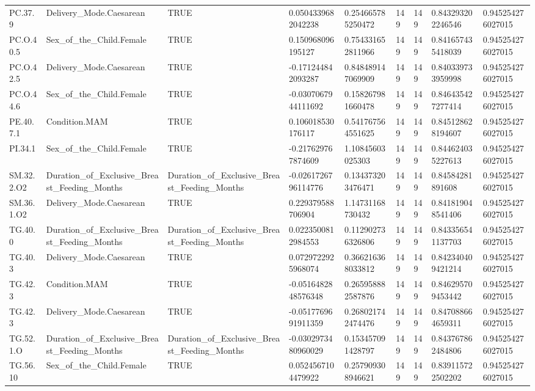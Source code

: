 \begin{longtable}{lllllllll}
PC.37.9 & Delivery\_Mode.Caesarean & TRUE & 0.0504339682042238 & 0.254665785250472 & 149 & 149 & 0.843293202246546 & 0.945254276027015 \\
PC.O.40.5 & Sex\_of\_the\_Child.Female & TRUE & 0.150968096195127 & 0.754331652811966 & 149 & 149 & 0.841657435418039 & 0.945254276027015 \\
PC.O.42.5 & Delivery\_Mode.Caesarean & TRUE & -0.171244842093287 & 0.848489147069909 & 149 & 149 & 0.840339733959998 & 0.945254276027015 \\
PC.O.44.6 & Sex\_of\_the\_Child.Female & TRUE & -0.0307067944111692 & 0.158267981660478 & 149 & 149 & 0.846435427277414 & 0.945254276027015 \\
PE.40.7.1 & Condition.MAM & TRUE & 0.106018530176117 & 0.541767564551625 & 149 & 149 & 0.845128628194607 & 0.945254276027015 \\
PI.34.1 & Sex\_of\_the\_Child.Female & TRUE & -0.217629767874609 & 1.10845603025303 & 149 & 149 & 0.844624035227613 & 0.945254276027015 \\
SM.32.2.O2 & Duration\_of\_Exclusive\_Breast\_Feeding\_Months & Duration\_of\_Exclusive\_Breast\_Feeding\_Months & -0.0261726796114776 & 0.134373203476471 & 149 & 149 & 0.84584281891608 & 0.945254276027015 \\
SM.36.1.O2 & Delivery\_Mode.Caesarean & TRUE & 0.229379588706904 & 1.14731168730432 & 149 & 149 & 0.841819048541406 & 0.945254276027015 \\
TG.40.0 & Duration\_of\_Exclusive\_Breast\_Feeding\_Months & Duration\_of\_Exclusive\_Breast\_Feeding\_Months & 0.0223500812984553 & 0.112902736326806 & 149 & 149 & 0.843356541137703 & 0.945254276027015 \\
TG.40.3 & Delivery\_Mode.Caesarean & TRUE & 0.0729722925968074 & 0.366216368033812 & 149 & 149 & 0.842340409421214 & 0.945254276027015 \\
TG.42.3 & Condition.MAM & TRUE & -0.0516482848576348 & 0.265958882587876 & 149 & 149 & 0.846295709453442 & 0.945254276027015 \\
TG.42.3 & Delivery\_Mode.Caesarean & TRUE & -0.0517769691911359 & 0.268021742474476 & 149 & 149 & 0.847088664659311 & 0.945254276027015 \\
TG.52.1.O & Duration\_of\_Exclusive\_Breast\_Feeding\_Months & Duration\_of\_Exclusive\_Breast\_Feeding\_Months & -0.0302973480960029 & 0.153457091428797 & 149 & 149 & 0.843767862484806 & 0.945254276027015 \\
TG.56.10 & Sex\_of\_the\_Child.Female & TRUE & 0.0524567104479922 & 0.257909308946621 & 149 & 149 & 0.839115722502202 & 0.945254276027015 \\

\end{longtable}
